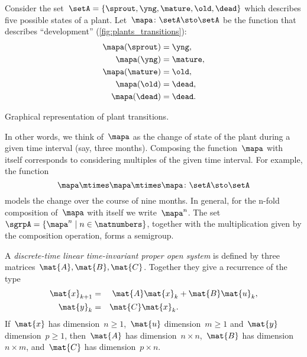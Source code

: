 \begin{example}
	\label{exa:plant-trafo-semigroup}
	Consider the set~$\setA = \{ \sprout, \yng, \mature, \old, \dead \}$ which describes five possible states of a plant.
	Let~$\mapa \colon \setA \sto \setA$ be the function that describes ``development'' (\cref{fig:plants_transitions}):
	\begin{align*}
		\mapa(\sprout) & =  \yng,    \\
		\mapa(\yng)    & =  \mature, \\
		\mapa(\mature) & =  \old,    \\
		\mapa( \old)   & = \dead,    \\
		\mapa (\dead)  & = \dead.
	\end{align*}
	\begin{marginfigure}
		\caption{Graphical representation of plant transitions.}
		\label{fig:plants_transitions}
	\end{marginfigure}
	In other words, we think of~$\mapa$ as the change of state of the plant during a given time interval (say, three months).
	Composing the function~$\mapa$ with itself corresponds to considering multiples of the given time interval.
	For example, the function
	\begin{equation*}
		\mapa \mtimes \mapa \mtimes \mapa \colon \setA \sto \setA
	\end{equation*}
	models the change over the course of nine months.
	In general, for the n-fold composition of~$\mapa$ with itself we write~$\mapa^n$.
	The set~$\sgrpA = \{ \mapa^n \mid n \in \natnumbers \}$, together with the multiplication given by the composition operation, forms a semigroup.
\end{example}

\begin{definition}
	\label{def:discrete-time-linear-system}
	A \emph{discrete-time linear time-invariant proper open system} is defined by three matrices~$\mat{A},\mat{B},\mat{C}$.
	Together they give a recurrence of the type
	\begin{equation}
		\label{eq:discrete-time-dynamics}
		\begin{aligned}
			\mat{x}_{k+1} & = & \mat{A} \mat{x}_k  & + \mat{B} \mat{u}_k, \\
			\mat{y}_{k}   & = & \mat{C} \mat{x}_k.                        \\
		\end{aligned}
	\end{equation}
	If~$\mat{x}$ has dimension~$n\geq1$,~$\mat{u}$ dimension~$m\geq1$ and~$\mat{y}$ dimension~$p\geq1$, then~$\mat{A}$ has dimension~$n \times n$,~$\mat{B}$ has dimension~$n \times m$, and~$\mat{C}$ has dimension~$p \times n$.
\end{definition}


